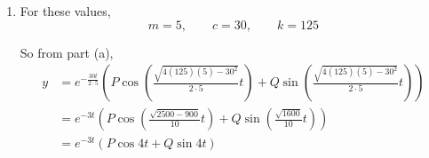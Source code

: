 \documentclass[leqno]{article}
\begin{document}
\begin{enumerate}[
  label=\textbf{\arabic*.},
  leftmargin=*,
  topsep=0pt,
  partopsep=0pt,
  parsep=0pt
]
\begin{tcolorbox}[colback=white, colframe=scarlet, title={\textbf{Solution}}, breakable, grow to left by=6mm, grow to right by=10mm]
\begin{enumerate}[label=\textbf{(\alph*)}]
  When the load is displaced a distance $y$ downward from equilibrium:

  \begin{itemize}
    \item the spring provides a restoring force upward of magnitude $ky$, so its force is $-ky$,
    \item the liquid resistance has magnitude $c\left|\frac{\mathrm{d}y}{\mathrm{d}t}\right|$ and acts opposite to the motion, so its force is $-c\frac{\mathrm{d}y}{\mathrm{d}t}$.
  \end{itemize}

  Using Newton's second law,
  \[
  m\frac{\mathrm{d}^2y}{\mathrm{d}t^2}=-c\frac{\mathrm{d}y}{\mathrm{d}t}-ky
  \]

  So
  \[
  m\frac{\mathrm{d}^2y}{\mathrm{d}t^2}+c\frac{\mathrm{d}y}{\mathrm{d}t}+ky=0
  \]

  To solve this differential equation, use the auxiliary equation
  \[
  m\lambda^2+c\lambda+k=0
  \]

  Using the quadratic formula,
  \begin{align*}
  \lambda
  &=\frac{-c\pm\sqrt{c^2-4mk}}{2m} \\
  &=\frac{-c\pm\sqrt{-(4km-c^2)}}{2m}
  \end{align*}

  Since $4km>c^2$, we have
  \[
  \sqrt{-(4km-c^2)}=i\sqrt{4km-c^2}
  \]

  Hence the roots are
  \[
  \lambda=\frac{-c}{2m}\pm i\frac{\sqrt{4km-c^2}}{2m}
  \]

  For roots of the form $\alpha\pm i\beta$, the complementary solution is
  \[
  y=e^{\alpha t}\left(P\cos \beta t+Q\sin \beta t\right)
  \]

  Here,
  \[
  \alpha=-\frac{c}{2m},
  \qquad
  \beta=\frac{\sqrt{4km-c^2}}{2m}
  \]

  Therefore
  \[
  y=e^{-\frac{ct}{2m}}\left(P\cos\left(\frac{\sqrt{4km-c^2}}{2m}t\right)+Q\sin\left(\frac{\sqrt{4km-c^2}}{2m}t\right)\right)
  \]

  This is the required form.

  \item For these values,
  \[
  m=5,\qquad c=30,\qquad k=125
  \]

  So from part (a),
  \begin{align*}
  y&=e^{-\frac{30t}{2\cdot 5}}\left(P\cos\left(\frac{\sqrt{4(125)(5)-30^2}}{2\cdot 5}t\right)+Q\sin\left(\frac{\sqrt{4(125)(5)-30^2}}{2\cdot 5}t\right)\right) \\
  &=e^{-3t}\left(P\cos\left(\frac{\sqrt{2500-900}}{10}t\right)+Q\sin\left(\frac{\sqrt{1600}}{10}t\right)\right) \\
  &=e^{-3t}\left(P\cos 4t+Q\sin 4t\right)
  \end{align*}


\end{enumerate}
\end{tcolorbox}
\end{enumerate}
\end{document}
